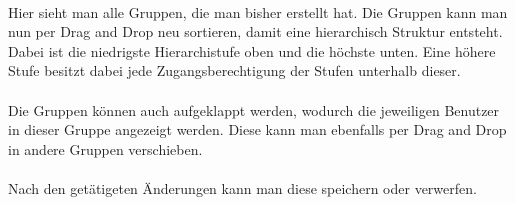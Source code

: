 \paragraph{}Hier sieht man alle Gruppen, die man bisher erstellt hat.
Die Gruppen kann man nun per Drag and Drop neu sortieren, damit eine hierarchisch Struktur entsteht.
Dabei ist die niedrigste Hierarchistufe oben und die höchste unten. 
Eine höhere Stufe besitzt dabei jede Zugangsberechtigung der Stufen unterhalb dieser. 
\\
\paragraph{}Die Gruppen können auch aufgeklappt werden, wodurch die jeweiligen Benutzer in dieser Gruppe angezeigt werden.
Diese kann man ebenfalls per Drag and Drop in andere Gruppen verschieben.
\\
\paragraph{}Nach den getätigeten Änderungen kann man diese speichern oder verwerfen. 